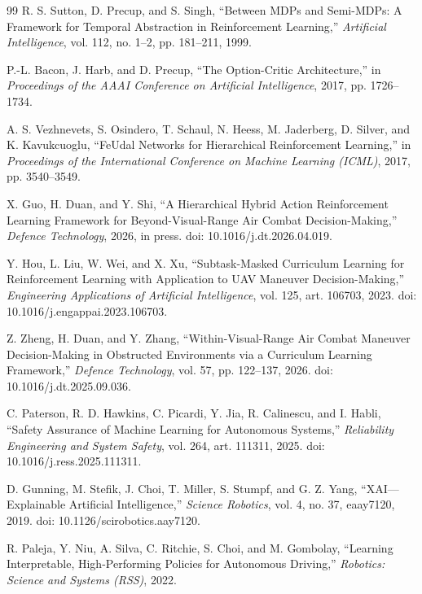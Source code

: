 \documentclass[5p,times]{elsarticle} %
\begin{document}
\begin{thebibliography}{99}
R. S. Sutton, D. Precup, and S. Singh,
``Between MDPs and Semi-MDPs: A Framework for Temporal Abstraction in Reinforcement Learning,''
\emph{Artificial Intelligence}, vol. 112, no. 1--2, pp. 181--211, 1999.

P.-L. Bacon, J. Harb, and D. Precup,
``The Option-Critic Architecture,''
in \emph{Proceedings of the AAAI Conference on Artificial Intelligence}, 2017, pp. 1726--1734.

A. S. Vezhnevets, S. Osindero, T. Schaul, N. Heess, M. Jaderberg, D. Silver, and K. Kavukcuoglu,
``FeUdal Networks for Hierarchical Reinforcement Learning,''
in \emph{Proceedings of the International Conference on Machine Learning (ICML)}, 2017, pp. 3540--3549.

X. Guo, H. Duan, and Y. Shi,
``A Hierarchical Hybrid Action Reinforcement Learning Framework for Beyond-Visual-Range Air Combat Decision-Making,''
\emph{Defence Technology}, 2026, in press.
doi: 10.1016/j.dt.2026.04.019.

Y. Hou, L. Liu, W. Wei, and X. Xu,
``Subtask-Masked Curriculum Learning for Reinforcement Learning with Application to UAV Maneuver Decision-Making,''
\emph{Engineering Applications of Artificial Intelligence}, vol. 125, art. 106703, 2023.
doi: 10.1016/j.engappai.2023.106703.

Z. Zheng, H. Duan, and Y. Zhang,
``Within-Visual-Range Air Combat Maneuver Decision-Making in Obstructed Environments via a Curriculum Learning Framework,''
\emph{Defence Technology}, vol. 57, pp. 122--137, 2026.
doi: 10.1016/j.dt.2025.09.036.

C. Paterson, R. D. Hawkins, C. Picardi, Y. Jia, R. Calinescu, and I. Habli,
``Safety Assurance of Machine Learning for Autonomous Systems,''
\emph{Reliability Engineering and System Safety}, vol. 264, art. 111311, 2025.
doi: 10.1016/j.ress.2025.111311.

D. Gunning, M. Stefik, J. Choi, T. Miller, S. Stumpf, and G. Z. Yang,
``XAI---Explainable Artificial Intelligence,''
\emph{Science Robotics}, vol. 4, no. 37, eaay7120, 2019.
doi: 10.1126/scirobotics.aay7120.

R. Paleja, Y. Niu, A. Silva, C. Ritchie, S. Choi, and M. Gombolay,
``Learning Interpretable, High-Performing Policies for Autonomous Driving,''
\emph{Robotics: Science and Systems (RSS)}, 2022.


\end{thebibliography}
\end{document}
